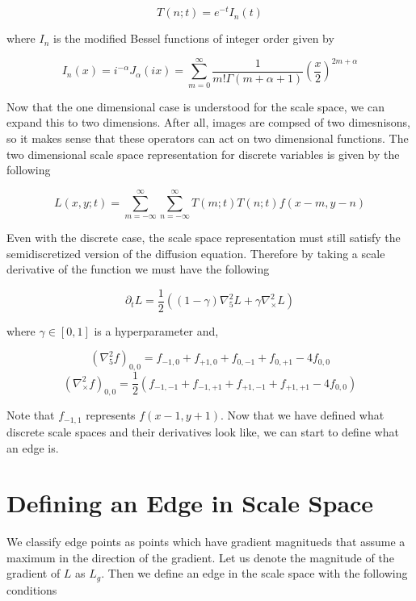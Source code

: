 \documentclass{article}
\begin{document}
\begin{equation}
  T(n;t) = e^{-t}I_n(t)
\end{equation}

where $I_n$ is the modified Bessel functions of integer order given by

\begin{equation}
  I_n(x) = i^{-\alpha}J_{\alpha}(ix) = \sum_{m=0}^{\infty}\frac{1}{m!\Gamma(m+\alpha+1)}\left(\frac{x}{2}\right)^{2m+\alpha}
\end{equation}

Now that the one dimensional case is understood for the scale space, we can expand this to two dimensions.
After all, images are compsed of two dimesnisons, so it makes sense that these operators can act on two dimensional functions.
The two dimensional scale space representation for discrete variables is given by the following

\begin{equation}
  L(x,y;t) = \sum_{m=-\infty}^{\infty}\sum_{n=-\infty}^{\infty}T(m;t)T(n;t)f(x-m,y-n)
\end{equation}

Even with the discrete case, the scale space representation must still satisfy the semidiscretized version of the diffusion equation.
Therefore by taking a scale derivative of the function we must have the following

\begin{equation}
  \partial_t L = \frac{1}{2}((1-\gamma)\nabla^2_5L+\gamma\nabla^2_\times L)
\end{equation}

where $\gamma \in [0,1]$ is a hyperparameter and,

\begin{equation}
  (\nabla^2_5f)_{0,0} = f_{-1,0} + f_{+1,0} + f_{0,-1} + f_{0,+1} - 4f_{0,0}
\end{equation}
\begin{equation}
  (\nabla^2_\times f)_{0,0} = \frac{1}{2}(f_{-1,-1} + f_{-1,+1} + f_{+1,-1} + f_{+1,+1} - 4f_{0,0})
\end{equation}

Note that $f_{-1,1}$ represents $f(x-1, y+1)$. Now that we have defined what discrete scale spaces and their derivatives look like, we can start to define what an edge is.

\section{Defining an Edge in Scale Space}
We classify edge points as points which have gradient magnitueds that assume a maximum in the direction of the gradient. Let us denote the magnitude of the gradient of $L$ as $L_g$. Then we define an edge in the scale space with the following conditions
\end{document}
